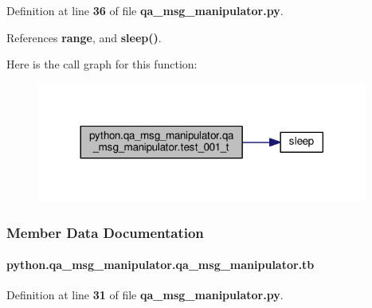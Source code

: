 Definition at line {\bf 36} of file {\bf qa\+\_\+msg\+\_\+manipulator.\+py}.



References {\bf range}, and {\bf sleep()}.



Here is the call graph for this function\+:
\nopagebreak
\begin{figure}[H]
\begin{center}
\leavevmode
\includegraphics[width=308pt]{d5/df1/classpython_1_1qa__msg__manipulator_1_1qa__msg__manipulator_a1acd20e0db3fd1a9a1267102834a8665_cgraph}
\end{center}
\end{figure}




\subsubsection{Member Data Documentation}
\paragraph[{tb}]{\setlength{\rightskip}{0pt plus 5cm}python.\+qa\+\_\+msg\+\_\+manipulator.\+qa\+\_\+msg\+\_\+manipulator.\+tb}\label{classpython_1_1qa__msg__manipulator_1_1qa__msg__manipulator_a164b5825ec257df110fea6c6d7e1fa3e}


Definition at line {\bf 31} of file {\bf qa\+\_\+msg\+\_\+manipulator.\+py}.



